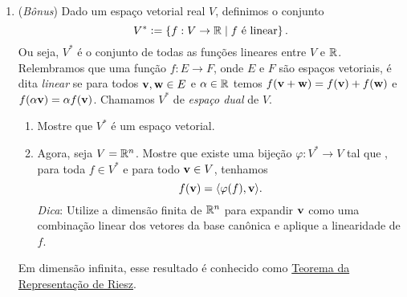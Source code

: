 \documentclass[leqno]{article}
\numberwithin{equation}{section}
\begin{document}
\begin{enumerate}
		\item (\textit{Bônus}) Dado um espaço vetorial real \( V \), definimos o conjunto
		\begin{equation*}
			V^{ * } \vcentcolon= \left\{ f : V \to \mathbb{R} \mid f \text{ é linear} \right\}
			.\end{equation*}
		Ou seja, \( V^{ * } \) é o conjunto de todas as funções lineares entre \( V \) e \( \mathbb{R} \).
		Relembramos que uma função \( f : E \to F \), onde \( E \) e \( F \) são espaços vetoriais, é dita \textit{linear} se para todos \( \mathbf{v}, \mathbf{w} \in E \) e \( \alpha \in \mathbb{R} \) temos \( f ( \mathbf{v} + \mathbf{w} ) = f ( \mathbf{v} ) + f ( \mathbf{w} ) \) e \( f ( \alpha \mathbf{v} ) = \alpha f ( \mathbf{v} ) \).
		Chamamos \( V^{ * } \) de \textit{espaço dual} de \( V \).
		\begin{enumerate}
			\item Mostre que \( V^{ * } \) é um espaço vetorial.
			
			\begin{sol} 
			\end{sol} 
			\item Agora, seja \( V = \mathbb{R}^{ n } \).
			Mostre que existe uma bijeção \( \varphi : V^{ * } \to V \) tal que , para toda \( f \in V^{ * } \) e para todo \( \mathbf{v} \in V \), tenhamos
			\begin{equation*}
				f(\mathbf{v}) = \langle\varphi(f), \mathbf{v}\rangle
				.\end{equation*} 
			\textit{Dica}: Utilize a dimensão finita de \( \mathbb{R}^{ n } \) para expandir \( \mathbf{v} \) como uma combinação linear dos vetores da base canônica e aplique a linearidade de \( f \).
			
			\begin{sol} 
			\end{sol} 	
		\end{enumerate}
		Em dimensão infinita, esse resultado é conhecido como \href{https://en.wikipedia.org/wiki/Riesz_representation_theorem}{Teorema da Representação de Riesz}.
	\end{enumerate}
	
\end{document}
